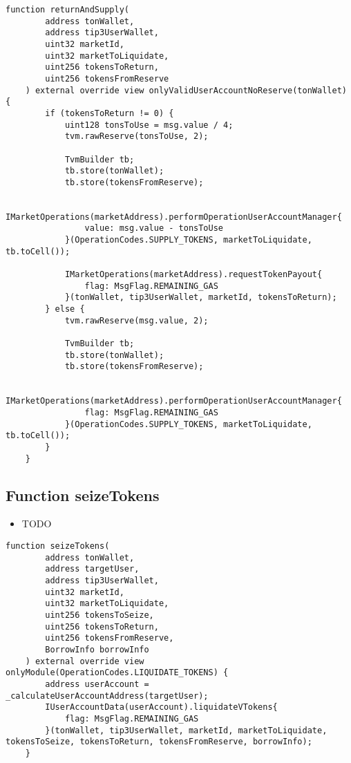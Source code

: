 \begin{lstlisting}[firstnumber=399]
    function returnAndSupply(
        address tonWallet,
        address tip3UserWallet,
        uint32 marketId,
        uint32 marketToLiquidate,
        uint256 tokensToReturn,
        uint256 tokensFromReserve
    ) external override view onlyValidUserAccountNoReserve(tonWallet) {
        if (tokensToReturn != 0) {
            uint128 tonsToUse = msg.value / 4;
            tvm.rawReserve(tonsToUse, 2);

            TvmBuilder tb;
            tb.store(tonWallet);
            tb.store(tokensFromReserve);

            IMarketOperations(marketAddress).performOperationUserAccountManager{
                value: msg.value - tonsToUse
            }(OperationCodes.SUPPLY_TOKENS, marketToLiquidate, tb.toCell());

            IMarketOperations(marketAddress).requestTokenPayout{
                flag: MsgFlag.REMAINING_GAS
            }(tonWallet, tip3UserWallet, marketId, tokensToReturn);
        } else {
            tvm.rawReserve(msg.value, 2);

            TvmBuilder tb;
            tb.store(tonWallet);
            tb.store(tokensFromReserve);

            IMarketOperations(marketAddress).performOperationUserAccountManager{
                flag: MsgFlag.REMAINING_GAS
            }(OperationCodes.SUPPLY_TOKENS, marketToLiquidate, tb.toCell());
        }
    }
\end{lstlisting}

\subsection{Function seizeTokens}

\noindent\begin{itemize}
\item TODO
\end{itemize}

\begin{lstlisting}[firstnumber=346]
    function seizeTokens(
        address tonWallet,
        address targetUser,
        address tip3UserWallet,
        uint32 marketId,
        uint32 marketToLiquidate,
        uint256 tokensToSeize, 
        uint256 tokensToReturn, 
        uint256 tokensFromReserve,
        BorrowInfo borrowInfo
    ) external override view onlyModule(OperationCodes.LIQUIDATE_TOKENS) {
        address userAccount = _calculateUserAccountAddress(targetUser);
        IUserAccountData(userAccount).liquidateVTokens{
            flag: MsgFlag.REMAINING_GAS
        }(tonWallet, tip3UserWallet, marketId, marketToLiquidate, tokensToSeize, tokensToReturn, tokensFromReserve, borrowInfo);
    }
\end{lstlisting}

